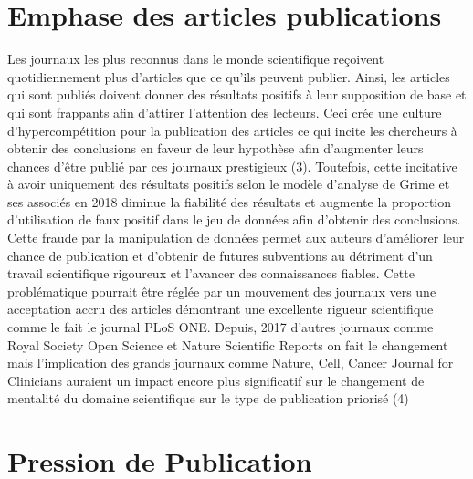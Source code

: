 \documentclass[9pt,twocolumn,twoside,]{pnas-new}
\begin{document}
\hypertarget{emphase-des-articles-publications}{%
\section{Emphase des articles
publications}\label{emphase-des-articles-publications}}

Les journaux les plus reconnus dans le monde scientifique reçoivent
quotidiennement plus d'articles que ce qu'ils peuvent publier. Ainsi,
les articles qui sont publiés doivent donner des résultats positifs à
leur supposition de base et qui sont frappants afin d'attirer
l'attention des lecteurs. Ceci crée une culture d'hypercompétition pour
la publication des articles ce qui incite les chercheurs à obtenir des
conclusions en faveur de leur hypothèse afin d'augmenter leurs chances
d'être publié par ces journaux prestigieux (3). Toutefois, cette
incitative à avoir uniquement des résultats positifs selon le modèle
d'analyse de Grime et ses associés en 2018 diminue la fiabilité des
résultats et augmente la proportion d'utilisation de faux positif dans
le jeu de données afin d'obtenir des conclusions. Cette fraude par la
manipulation de données permet aux auteurs d'améliorer leur chance de
publication et d'obtenir de futures subventions au détriment d'un
travail scientifique rigoureux et l'avancer des connaissances fiables.
Cette problématique pourrait être réglée par un mouvement des journaux
vers une acceptation accru des articles démontrant une excellente
rigueur scientifique comme le fait le journal PLoS ONE. Depuis, 2017
d'autres journaux comme Royal Society Open Science et Nature Scientific
Reports on fait le changement mais l'implication des grands journaux
comme Nature, Cell, Cancer Journal for Clinicians auraient un impact
encore plus significatif sur le changement de mentalité du domaine
scientifique sur le type de publication priorisé (4)

\hypertarget{pression-de-publication}{%
\section{Pression de Publication}\label{pression-de-publication}}
\end{document}
